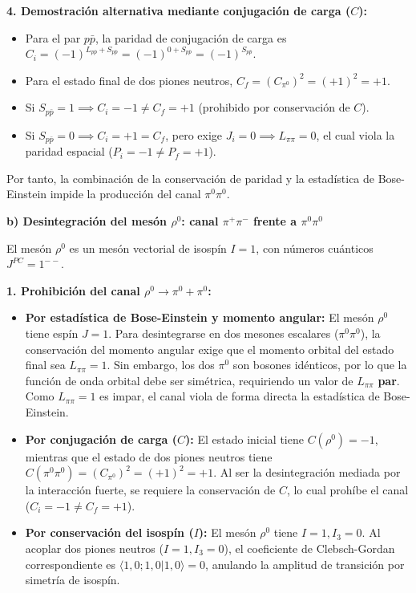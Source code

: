 \begin{problema}
\textbf{4. Demostración alternativa mediante conjugación de carga ($C$):}
\begin{itemize}
    \item Para el par $p\bar{p}$, la paridad de conjugación de carga es $C_i = (-1)^{L_{p\bar{p}} + S_{p\bar{p}}} = (-1)^{0 + S_{p\bar{p}}} = (-1)^{S_{p\bar{p}}}$.
    \item Para el estado final de dos piones neutros, $C_f = (C_{\pi^0})^2 = (+1)^2 = +1$.
    \item Si $S_{p\bar{p}} = 1 \implies C_i = -1 \neq C_f = +1$ (prohibido por conservación de $C$).
    \item Si $S_{p\bar{p}} = 0 \implies C_i = +1 = C_f$, pero exige $J_i = 0 \implies L_{\pi\pi} = 0$, el cual viola la paridad espacial ($P_i = -1 \neq P_f = +1$).
\end{itemize}
Por tanto, la combinación de la conservación de paridad y la estadística de Bose-Einstein impide la producción del canal $\pi^0\pi^0$.

\vspace{0.3cm}
\textbf{b) Desintegración del mesón $\rho^0$: canal $\pi^+\pi^-$ frente a $\pi^0\pi^0$}

El mesón $\rho^0$ es un mesón vectorial de isospín $I = 1$, con números cuánticos $J^{PC} = 1^{--}$.

\textbf{1. Prohibición del canal $\rho^0 \to \pi^0 + \pi^0$:}
\begin{itemize}
    \item \textbf{Por estadística de Bose-Einstein y momento angular:} El mesón $\rho^0$ tiene espín $J = 1$. Para desintegrarse en dos mesones escalares ($\pi^0\pi^0$), la conservación del momento angular exige que el momento orbital del estado final sea $L_{\pi\pi} = 1$. Sin embargo, los dos $\pi^0$ son bosones idénticos, por lo que la función de onda orbital debe ser simétrica, requiriendo un valor de $L_{\pi\pi}$ \textbf{par}. Como $L_{\pi\pi} = 1$ es impar, el canal viola de forma directa la estadística de Bose-Einstein.
    \item \textbf{Por conjugación de carga ($C$):} El estado inicial tiene $C(\rho^0) = -1$, mientras que el estado de dos piones neutros tiene $C(\pi^0\pi^0) = (C_{\pi^0})^2 = (+1)^2 = +1$. Al ser la desintegración mediada por la interacción fuerte, se requiere la conservación de $C$, lo cual prohíbe el canal ($C_i = -1 \neq C_f = +1$).
    \item \textbf{Por conservación del isospín ($I$):} El mesón $\rho^0$ tiene $I = 1, I_3 = 0$. Al acoplar dos piones neutros ($I=1, I_3=0$), el coeficiente de Clebsch-Gordan correspondiente es $\langle 1, 0; 1, 0 | 1, 0 \rangle = 0$, anulando la amplitud de transición por simetría de isospín.
\end{itemize}


\end{problema}

